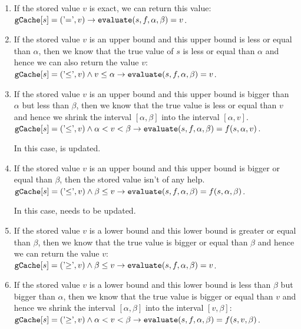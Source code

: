 \begin{enumerate}
\item If the stored value $v$ is exact, we can return this value:
      \\[0.2cm]
      \hspace*{1.3cm}
      $\texttt{gCache}[s] = (\mbox{'$=$'}, v) \rightarrow \texttt{evaluate}(s, f, \alpha, \beta) = v$.
\item If the stored value $v$ is an upper bound and this upper bound is less or equal than $\alpha$, then we know that
      the true value of $s$ is less or equal than $\alpha$ and hence we can also return the value $v$:
      \\[0.2cm]
      \hspace*{1.3cm}
      $\texttt{gCache}[s] = (\mbox{'$\leq$'}, v) \wedge v \leq \alpha \rightarrow 
     \texttt{evaluate}(s, f, \alpha, \beta) = v$.
\item If the stored value $v$ is an upper bound and this upper bound is bigger than $\alpha$ but less than
      $\beta$, then we know that the true value is less or equal than $v$ and hence we shrink the interval
      $[\alpha, \beta]$ into the interval $[\alpha, v]$.
      \\[0.2cm]
      \hspace*{1.3cm}
      $\texttt{gCache}[s] = (\mbox{'$\leq$'}, v) \wedge \alpha < v < \beta \rightarrow 
     \texttt{evaluate}(s, f, \alpha, \beta) = f(s, \alpha, v)$.
     
      In this case,  is updated.  

\item If the stored value $v$ is an upper bound and this upper bound is bigger or equal than $\beta$, then the
      stored value isn't of any help. 
      \\[0.2cm]
      \hspace*{1.3cm}
      $\texttt{gCache}[s] = (\mbox{'$\leq$'}, v) \wedge \beta \leq v \rightarrow 
     \texttt{evaluate}(s, f, \alpha, \beta) = f(s, \alpha, \beta)$.

      In this case,   needs to be updated.

\item If the stored value $v$ is a lower bound and this lower bound is greater or equal than $\beta$, then we 
      know that the true value is bigger or equal than $\beta$ and hence we can return the value $v$: 
      \\[0.2cm]
      \hspace*{1.3cm}
      $\texttt{gCache}[s] = (\mbox{'$\geq$'}, v) \wedge \beta \leq v \rightarrow 
     \texttt{evaluate}(s, f, \alpha, \beta) = v$.
\item If the stored value $v$ is a lower bound and this lower bound is less than $\beta$ but bigger than $\alpha$,
      then we know that the true value is bigger or equal than $v$ and hence we shrink the interval $[\alpha,\beta]$
      into the interval $[v, \beta]$: 
      \\[0.2cm]
      \hspace*{1.3cm}
      $\texttt{gCache}[s] = (\mbox{'$\geq$'}, v) \wedge \alpha < v < \beta \rightarrow 
     \texttt{evaluate}(s, f, \alpha, \beta) = f(s, v, \beta)$.
     

\end{enumerate}
